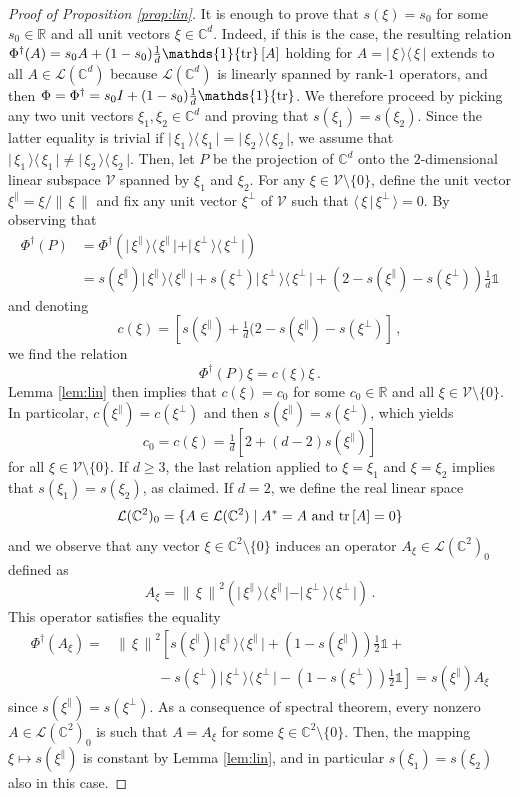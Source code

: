 \documentclass[12pt,reqno]{amsart}
\theoremstyle{definition}
\newcommand{\ip}[2]{\langle\,#1\,\vert\,#2\,\rangle} %
\newcommand{\kb}[2]{\vert\,#1\,\rangle\langle\,#2\,\vert} %
\newcommand{\no}[1]{\left\|\,#1\,\right\|} %
\newcommand{\tr}[1]{{\rm tr}\left[#1\right]} %
\newcommand{\id}{\mathds{1}} %
\newcommand{\Cb}{\mathbb{C}} %
\newcommand{\Rb}{\mathbb{R}} %
\newcommand{\ca}[1]{\mathcal{#1}} %
\newcommand{\lc}[1]{\mathcal{L}(\Cb^{#1})} %
\begin{document}
\begin{proof}[Proof of Proposition \ref{prop:lin}]
It is enough to prove that $s(\xi) = s_0$ for some $s_0\in\Rb$ and all unit vectors $\xi\in\Cb^d$. Indeed, if this is the case, the resulting relation $\Phi^\dag(A) = s_0 A + (1-s_0)\tfrac{1}{d}\id\tr{A}$ holding for $A=\kb{\xi}{\xi}$ extends to all $A\in\lc{d}$ because $\lc{d}$ is linearly spanned by rank-$1$ operators, and then $\Phi = \Phi^\dag = s_0 I + (1-s_0)\tfrac{1}{d}\id {\rm tr}$. We therefore proceed by picking any two unit vectors $\xi_1,\xi_2\in\Cb^d$ and proving that $s(\xi_1) = s(\xi_2)$. Since the latter equality is trivial if $\kb{\xi_1}{\xi_1} = \kb{\xi_2}{\xi_2}$, we assume that $\kb{\xi_1}{\xi_1} \neq \kb{\xi_2}{\xi_2}$. Then, let $P$ be the projection of $\Cb^d$ onto the $2$-dimensional linear subspace $\ca{V}$ spanned by $\xi_1$ and $\xi_2$. For any $\xi\in\ca{V}\setminus\{0\}$, define the unit vector $\xi^\parallel = \xi / \no{\xi}$ and fix any unit vector $\xi^\perp$ of $\ca{V}$ such that $\ip{\xi}{\xi^\perp} = 0$. By observing that
\begin{align*}
\Phi^\dag(P) & = \Phi^\dag(\kb{\xi^\parallel}{\xi^\parallel} + \kb{\xi^\perp}{\xi^\perp}) \\
& = s(\xi^\parallel) \kb{\xi^\parallel}{\xi^\parallel} + s(\xi^\perp) \kb{\xi^\perp}{\xi^\perp} + ( 2 - s(\xi^\parallel) - s(\xi^\perp) )\tfrac{1}{d}\id
\end{align*}
and denoting
$$
c(\xi) = \left[s(\xi^\parallel) + \tfrac{1}{d} (2-s(\xi^\parallel)-s(\xi^\perp)\right] \,,
$$
we find the relation
$$
\Phi^\dag(P) \xi = c(\xi) \xi \,.
$$
Lemma \ref{lem:lin} then implies that $c(\xi) = c_0$ for some $c_0\in\Rb$ and all $\xi\in\ca{V}\setminus\{0\}$. In particolar, $c(\xi^\parallel) = c(\xi^\perp)$ and then $s(\xi^\parallel) = s(\xi^\perp)$, which yields
$$
c_0 = c(\xi) = \tfrac{1}{d} \left[ 2 + (d-2) s(\xi^\parallel) \right]
$$
for all $\xi\in\ca{V}\setminus\{0\}$. If $d \geq 3$, the last relation applied to $\xi=\xi_1$ and $\xi=\xi_2$ implies that $s(\xi_1) = s(\xi_2)$, as claimed. If $d=2$, we define the real linear space
$$
\lc{2}_0 = \{A\in\lc{2}\mid A^\ast = A \text{ and } \tr{A} = 0\}
$$
and we observe that any vector $\xi\in\Cb^2\setminus\{0\}$ induces an operator $A_\xi\in\lc{2}_0$ defined as
$$
A_\xi = \no{\xi}^2 (\kb{\xi^\parallel}{\xi^\parallel} - \kb{\xi^\perp}{\xi^\perp})\,.
$$
This operator satisfies the equality
\begin{align*}
\Phi^\dag(A_\xi) = {} & \no{\xi}^2 \left[ s(\xi^\parallel) \kb{\xi^\parallel}{\xi^\parallel} + (1-s(\xi^\parallel)) \tfrac{1}{2} \id + \right. \\
{} & \left. \qquad\quad - s(\xi^\perp) \kb{\xi^\perp}{\xi^\perp} - (1-s(\xi^\perp)) \tfrac{1}{2} \id \right] = s(\xi^\parallel) A_\xi
\end{align*}
since $s(\xi^\parallel) = s(\xi^\perp)$. As a consequence of spectral theorem, every nonzero $A\in\lc{2}_0$ is such that $A = A_\xi$ for some $\xi\in\Cb^2\setminus\{0\}$. Then, the mapping $\xi\mapsto s(\xi^\parallel)$ is constant by Lemma \ref{lem:lin}, and in particular $s(\xi_1) = s(\xi_2)$ also in this case.
\end{proof}
\end{document}
